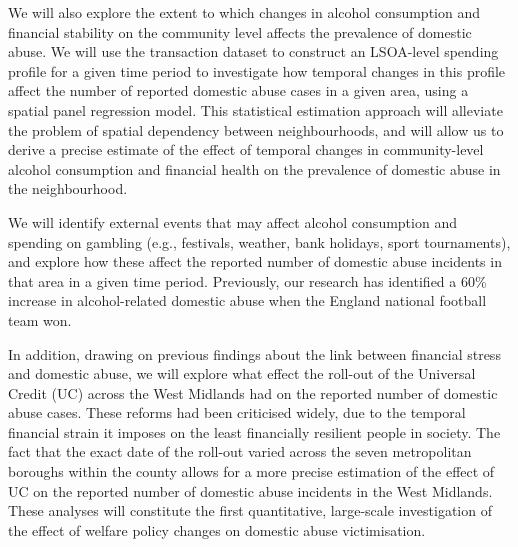 \documentclass[11pt, a4paper]{article}
\begin{document}



We will also explore the extent to which changes in alcohol consumption and financial stability on the community level affects the prevalence of domestic abuse. We will use the transaction dataset to construct an LSOA-level spending profile for a given time period to investigate how temporal changes in this profile affect the number of reported domestic abuse cases in a given area, using a spatial panel regression model. This statistical estimation approach will alleviate the problem of spatial dependency between neighbourhoods, and will allow us to derive a precise estimate of the effect of temporal changes in community-level alcohol consumption and financial health on the prevalence of domestic abuse in the neighbourhood. 

We will identify external events that may affect alcohol consumption  and spending on gambling (e.g., festivals, weather, bank holidays, sport tournaments), and explore how these affect the reported number of domestic abuse incidents in that area in a given time period. Previously, our research has identified a 60\% increase in alcohol-related domestic abuse when the England national football team won.


In addition, drawing on previous findings about the link between financial stress and domestic abuse, we will explore what effect the roll-out of the Universal Credit (UC) across the West Midlands had on the reported number of domestic abuse cases. These reforms had been criticised widely, due to the temporal financial strain it imposes on the least financially resilient people in society. The fact that the exact date of the roll-out varied across the seven metropolitan boroughs within the county allows for a more precise estimation of the effect of UC on the reported number of domestic abuse incidents in the West Midlands. These analyses will constitute the first quantitative, large-scale investigation of the effect of welfare policy changes on domestic abuse victimisation. 
\end{document}
